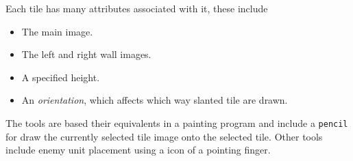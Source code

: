 Each tile has many attributes associated with it, these include 
\begin{itemize}
	\item The main image.
	\item The left and right wall images.
	\item A specified height.
	\item An \emph{orientation}, which affects which way slanted tile are drawn.
\end{itemize}

The tools are based their equivalents in a painting program  and include a \texttt{pencil} for draw the currently selected tile image onto the selected tile.  Other tools include enemy unit placement using a icon of a pointing finger. 



